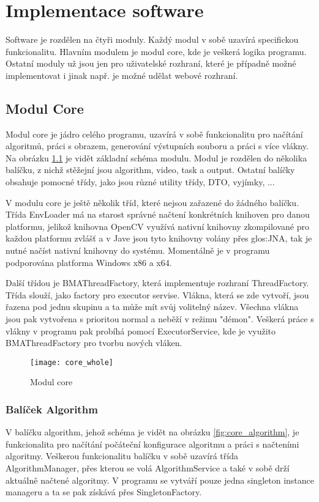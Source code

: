 \chapter{Implementace software}
Software je rozdělen na čtyři moduly. Každý modul v sobě uzavírá specifickou funkcionalitu. Hlavním modulem je modul core, kde je veškerá logika programu. Ostatní moduly už jsou jen pro uživatelské rozhraní, které je případně možné implementovat i jinak např. je možné udělat webové rozhraní.
\section{Modul Core}
Modul core je jádro celého programu, uzavírá v sobě funkcionalitu pro načítání algoritmů, práci s obrazem, generování výstupních souboru a práci s více vlákny. Na obrázku \ref{fig:core_whole} je vidět základní schéma modulu. Modul je rozdělen do několika balíčku, z nichž stěžejní jsou algorithm, video, task a output. Ostatní balíčky obsahuje pomocné třídy, jako jsou různé utility třídy, DTO, vyjímky, ...

V modulu core je ještě několik tříd, které nejsou zařazené do žádného balíčku. Třída EnvLoader má na starost správné načtení konkrétních knihoven pro danou platformu, jelikož knihovna OpenCV využívá nativní knihovny zkompilované pro každou platformu zvlášť a v Jave jsou tyto knihovny volány přes \gls{glos:JNA}, tak je nutné načíst nativní knihovny do systému. Momentálně je v programu podporována platforma Windows x86 a x64.

Další třídou je BMAThreadFactory, která implementuje rozhraní ThreadFactory. Třída slouží, jako factory pro executor servise. Vlákna, která se zde vytvoří, jsou řazena pod jednu skupinu a ta může mít svůj volitelný název. Všechna vlákna jsou pak vytvořena s prioritou normal a neběží v režimu "démon". Veškerá práce s vlákny v programu pak probíhá pomocí ExecutorService, kde je využito BMAThreadFactory pro tvorbu nových vláken.

\begin{figure}[h]
	\texttt{[image: core\_whole]}
	\centering
	\caption{Modul core \label{fig:core_whole}}
\end{figure} 
\FloatBarrier
\subsection{Balíček Algorithm}
V balíčku algorithm, jehož schéma je vidět na obrázku \ref{fig:core_algorithm}, je funkcionalita pro načítání počáteční konfigurace algoritmu a práci s načteními algoritmy. Veškerou funkcionalitu balíčku v sobě uzavírá třída AlgorithmManager, přes kterou se volá AlgorithmService a také v sobě drží aktuálně načtené algoritmy. V programu se vytváří pouze jedna singleton instance manageru a ta se pak získává přes SingletonFactory.

